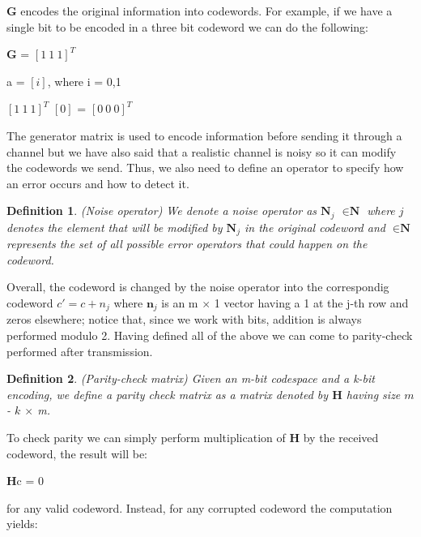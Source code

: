\documentclass{Configuration_Files/PoliMi3i_thesis}
\newtheorem{definition}{Definition}[chapter]
\begin{document}
\textbf{G} encodes the original information into { codewords}. For example, if we have a single bit to be encoded in a three bit codeword we can do the following: 

\begin{center}
	\textbf{G} = $[1 \ 1 \ 1]^{T}$  
\end{center}
\begin{center}
	a = $[i]$, where i = 0,1 
\end{center}
\begin{center}
	$[1 \ 1 \ 1]^{T}$ $[0]$ = $[0 \ 0 \ 0]^{T}$
\end{center}

The { generator matrix} is used to encode information before sending it through a channel but we have also said that a realistic channel is noisy so it can modify the codewords we send. Thus, we also need to define an operator to specify how an error occurs and how to detect it. 

\begin{definition}(Noise operator)
	We denote a noise operator as $\textbf{N}_j$ $\in \textbf{N}$ where $j$ denotes the element that will be modified by $\textbf{N}_j$ in the original codeword and $\in \textbf{N}$  represents the set of all possible error operators that could happen on the codeword. 
\end{definition} 

Overall, the codeword is changed by the noise operator into the correspondig codeword $c' =c + n_j$ where $\textbf{n}_j$ is an m $\times$ 1 vector having a 1 at the j-th row and zeros elsewhere; notice that, since we work with bits, addition is always performed modulo 2.\newline
Having defined all of the above we can come to parity-check performed after transmission.

\begin{definition}(Parity-check matrix)
	Given an m-bit codespace and a k-bit encoding, we define a parity check matrix as a matrix denoted by $\textbf{H}$ having size $m$ - $k$ $\times$ m.
\end{definition}

To check parity we can simply perform multiplication of {\bf H} by the received codeword, the result will be: 

\begin{center}
	\textbf{H}c = 0  
\end{center}

for any valid codeword. Instead, for any corrupted codeword the computation yields:
\end{document}
